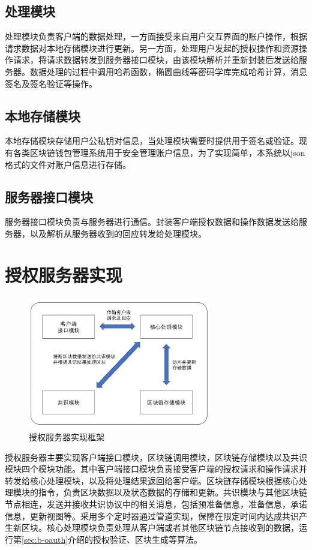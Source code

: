 \subsection{处理模块}

处理模块负责客户端的数据处理，一方面接受来自用户交互界面的账户操作，根据请求数据对本地存储模块进行更新。另一方面，处理用户发起的授权操作和资源操作请求，将请求数据转发到服务器接口模块，由该模块解析并重新封装后发送给服务器。数据处理的过程中调用哈希函数，椭圆曲线等密码学库完成哈希计算，消息签名及签名验证等操作。

\subsection{本地存储模块}

本地存储模块存储用户公私钥对信息，当处理模块需要时提供用于签名或验证。现有各类区块链钱包管理系统用于安全管理账户信息，为了实现简单，本系统以json格式的文件对账户信息进行存储。

\subsection{服务器接口模块}

服务器接口模块负责与服务器进行通信。封装客户端授权数据和操作数据发送给服务器，以及解析从服务器收到的回应转发给处理模块。

\section{授权服务器实现}

\begin{figure}[htb]
\centering
\includegraphics[width=8cm, keepaspectratio]{figures/imple-auth.png}
\caption{授权服务器实现框架}
\label{fig:imple-auth}
\end{figure}

授权服务器主要实现客户端接口模块，区块链调用模块，区块链存储模块以及共识模块四个模块功能。其中客户端接口模块负责接受客户端的授权请求和操作请求并转发给核心处理模块，以及将处理结果返回给客户端。区块链存储模块根据核心处理模块的指令，负责区块数据以及状态数据的存储和更新。共识模块与其他区块链节点相连，发送并接收共识协议中的相关消息，包括预准备信息，准备信息，承诺信息，更新视图等。采用多个定时器通过管道实现，保障在限定时间内达成共识产生新区块。核心处理模块负责处理从客户端或者其他区块链节点接收到的数据，运行第\ref{sec:b-oauth}介绍的授权验证、区块生成等算法。

